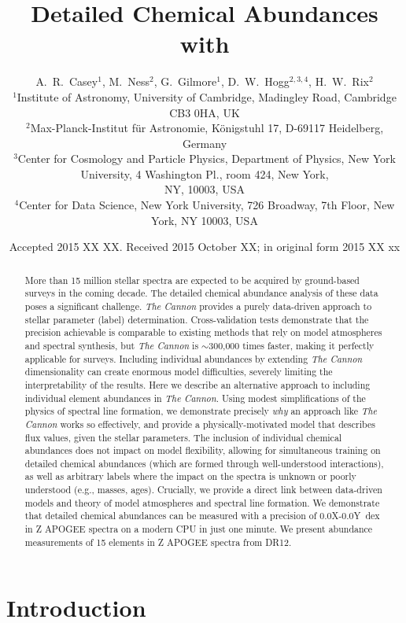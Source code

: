 \documentclass[useAMS,usenatbib]{mn2e}
\title[Cannon Chemistry]{Detailed Chemical Abundances with \tc{}}
\author[Casey et al.]{A.~R.~Casey$^1$, M.~Ness$^2$, G.~Gilmore$^1$,
    D.~W.~Hogg$^{2,3,4}$, H.~W.~Rix$^2$ \\ 
$^1$Institute of Astronomy, University of Cambridge, Madingley Road, Cambridge
    CB3 0HA, UK\\
$^2$Max-Planck-Institut f\"ur Astronomie, K\"onigstuhl 17, D-69117 Heidelberg,
    Germany\\
$^3$Center for Cosmology and Particle Physics, Department of Physics, New York
    University, 4 Washington Pl., room 424, New York, \\
    NY, 10003, USA\\
$^4$Center for Data Science, New York University, 726 Broadway, 7th Floor,
    New York, NY 10003, USA}
\newcommand\tc{\textit{The Cannon}}
\begin{document}
\date{Accepted 2015 XX XX. Received 2015 October XX; in original form 2015 XX xx}

\pagerange{\pageref{firstpage}--\pageref{lastpage}} 

\maketitle

\label{firstpage}

\begin{abstract}
More than 15 million stellar spectra are expected to be acquired by ground-based surveys in
the coming decade. The detailed chemical abundance analysis of these data poses
a significant challenge. \tc{} provides a purely data-driven
approach to stellar parameter (label) determination. Cross-validation tests
demonstrate that the precision achievable is comparable to existing methods that
rely on model atmospheres and spectral synthesis, but \tc{} is $\sim$300,000 times
faster, making it perfectly applicable for surveys. Including individual abundances by extending \tc{} dimensionality can create enormous model difficulties, severely limiting the interpretability of the results. Here
we describe an alternative approach to including individual element abundances
in \tc{}. Using modest simplifications of the physics of spectral line formation,
we demonstrate precisely \textit{why} an approach like \tc{} works so effectively,
and provide a physically-motivated model that describes flux values, given the
stellar parameters. The inclusion of individual chemical abundances does not
impact on model flexibility, allowing for simultaneous training on detailed
chemical abundances (which are formed through well-understood interactions), as well as arbitrary labels where the impact on the spectra
is unknown or poorly understood (e.g., masses, ages). Crucially, we provide a direct link
between data-driven models and theory of model atmospheres and spectral line formation. We demonstrate that
detailed chemical abundances can be measured with a precision of 0.0X-0.0Y~dex
in Z APOGEE spectra on a modern CPU in just one minute. We present abundance
measurements of 15 elements in Z APOGEE spectra from DR12.
\end{abstract}

\begin{keywords}
\end{keywords}

\section{Introduction}
\label{sec:introduction}
\end{document}
